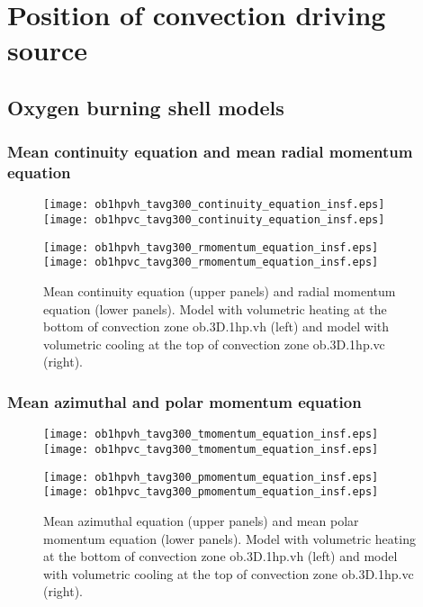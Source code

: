 \documentclass[10pt,paper=a4]{report}
\begin{document}
\newpage

\section{Position of convection driving source}

\subsection{Oxygen burning shell models}

\subsubsection{Mean continuity equation and mean radial momentum equation}

\begin{figure}[!h]
\centerline{
\texttt{[image: ob1hpvh\_tavg300\_continuity\_equation\_insf.eps]}
\texttt{[image: ob1hpvc\_tavg300\_continuity\_equation\_insf.eps]}}

\centerline{
\texttt{[image: ob1hpvh\_tavg300\_rmomentum\_equation\_insf.eps]}
\texttt{[image: ob1hpvc\_tavg300\_rmomentum\_equation\_insf.eps]}}
\caption{Mean continuity equation (upper panels) and radial momentum equation (lower panels). Model with volumetric heating at the bottom of convection zone {\sf ob.3D.1hp.vh} (left) and model with volumetric cooling at the top of convection zone {\sf ob.3D.1hp.vc} (right).}
\end{figure}

\newpage

\subsubsection{Mean azimuthal and polar momentum equation}

\begin{figure}[!h]
\centerline{
\texttt{[image: ob1hpvh\_tavg300\_tmomentum\_equation\_insf.eps]}
\texttt{[image: ob1hpvc\_tavg300\_tmomentum\_equation\_insf.eps]}}

\centerline{
\texttt{[image: ob1hpvh\_tavg300\_pmomentum\_equation\_insf.eps]}
\texttt{[image: ob1hpvc\_tavg300\_pmomentum\_equation\_insf.eps]}}
\caption{Mean azimuthal equation (upper panels) and mean polar momentum equation (lower panels). Model with volumetric heating at the bottom of convection zone {\sf ob.3D.1hp.vh} (left) and model with volumetric cooling at the top of convection zone {\sf ob.3D.1hp.vc} (right).}
\end{figure}
\end{document}
